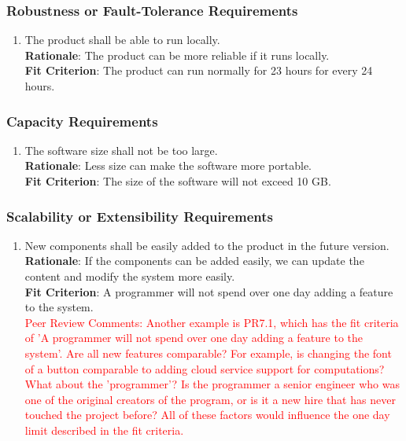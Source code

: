 \documentclass{article}
\begin{document}
\subsubsection{Robustness or Fault-Tolerance Requirements}
\begin{enumerate}[PR5.1]
    \item The product shall be able to run locally.\\
    \textbf{Rationale}: The product can be more reliable if it runs locally.\\
    \textbf{Fit Criterion}: The product can run normally for 23 hours for every 24 hours.
\end{enumerate}
\subsubsection{Capacity Requirements}
\begin{enumerate}[PR6.1]
    \item The software size shall not be too large.\\
    \textbf{Rationale}: Less size can make the software more portable.\\
    \textbf{Fit Criterion}: The size of the software will not exceed 10 GB.
\end{enumerate}
\subsubsection{Scalability or Extensibility Requirements}
\begin{enumerate}[PR7.1]
    \item New components shall be easily added to the product in the future version.\\
    \textbf{Rationale}: If the components can be added easily, we can update the content and modify the system more easily.\\
    \textbf{Fit Criterion}: A programmer will not spend over one day adding a feature to the system.\\
    \textcolor{red}{Peer Review Comments: Another example is PR7.1, which has the fit criteria of 'A programmer will not spend over one day adding a feature to the system'.
Are all new features comparable? For example, is changing the font of a button comparable to adding cloud service support for computations?
What about the 'programmer'? Is the programmer a senior engineer who was one of the original creators of the program, or is it a new hire that has never touched the project before?
All of these factors would influence the one day limit described in the fit criteria.}
\end{enumerate}
\end{document}
